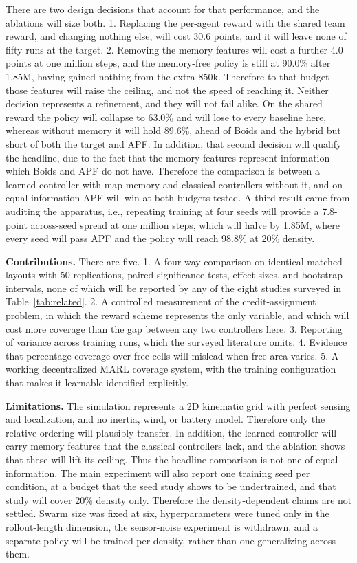 \documentclass[a4paper, 10pt, conference]{ieeeconf}
\begin{document}
There are two design decisions that account for that performance, and
the ablations will size both. 1. Replacing the per-agent reward with
the shared team reward, and changing nothing else, will cost 30.6
points, and it will leave none of fifty runs at the target. 2.
Removing the memory features will cost a further 4.0 points at one
million steps, and the memory-free policy is still at 90.0\% after
1.85M, having gained nothing from the extra 850k. Therefore to that
budget those features will raise the ceiling, and not the speed of
reaching it. Neither decision represents a refinement, and they will
not fail alike. On the shared reward the policy will collapse to
63.0\% and will lose to every baseline here, whereas without memory it
will hold 89.6\%, ahead of Boids and the hybrid but short of both the
target and APF. In addition, that second decision will qualify the
headline, due to the fact that the memory features represent
information which Boids and APF do not have. Therefore the comparison
is between a learned controller with map memory and classical
controllers without it, and on equal information APF will win at both
budgets tested. A third result came from auditing the apparatus, i.e.,
repeating training at four seeds will provide a 7.8-point across-seed
spread at one million steps, which will halve by 1.85M, where every
seed will pass APF and the policy will reach 98.8\% at 20\% density.

\textbf{Contributions.} There are five. 1. A four-way comparison on
identical matched layouts with 50 replications, paired significance
tests, effect sizes, and bootstrap intervals, none of which will be
reported by any of the eight studies surveyed in
Table~\ref{tab:related}. 2. A controlled measurement of the
credit-assignment problem, in which the reward scheme represents the
only variable, and which will cost more coverage than the gap between
any two controllers here. 3. Reporting of variance across training
runs, which the surveyed literature omits. 4. Evidence that percentage
coverage over free cells will mislead when free area varies. 5. A
working decentralized MARL coverage system, with the training
configuration that makes it learnable identified explicitly.

\textbf{Limitations.} The simulation represents a 2D kinematic grid
with perfect sensing and localization, and no inertia, wind, or
battery model. Therefore only the relative ordering will plausibly
transfer. In addition, the learned controller will carry memory
features that the classical controllers lack, and the ablation shows
that these will lift its ceiling. Thus the headline comparison is not
one of equal information. The main experiment will also report one
training seed per condition, at a budget that the seed study shows to
be undertrained, and that study will cover 20\% density only.
Therefore the density-dependent claims are not settled. Swarm size was
fixed at six, hyperparameters were tuned only in the rollout-length
dimension, the sensor-noise experiment is withdrawn, and a separate
policy will be trained per density, rather than one generalizing
across them.
\end{document}
